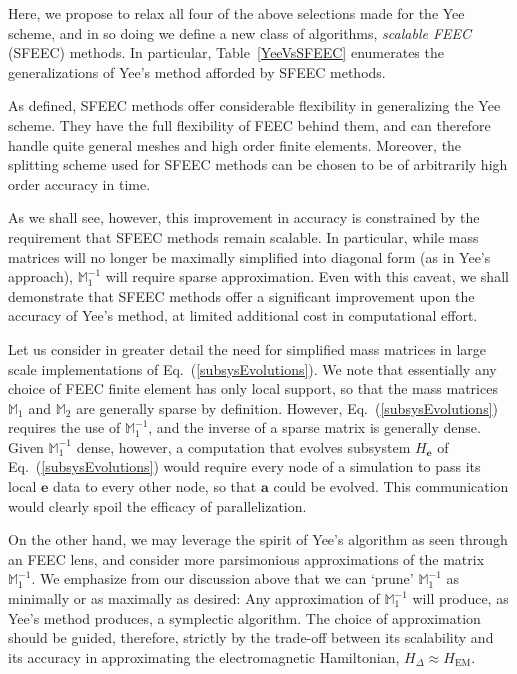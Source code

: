 \documentclass[final,twocolumn]{elsarticle}
\newcommand{\w}[1]{\ensuremath{\mathbf{#1}}} %
\newcommand*\mM{\mathbb{M}}
\begin{document}
Here, we propose to relax all four of the above selections made for the Yee scheme, and in so doing we define a new class of algorithms, \emph{scalable FEEC} (SFEEC) methods. In particular, Table~\ref{YeeVsSFEEC} enumerates the generalizations of Yee's method afforded by SFEEC methods.

As defined, SFEEC methods offer considerable flexibility in generalizing the Yee scheme. They have the full flexibility of FEEC behind them, and can therefore handle quite general meshes and high order finite elements. Moreover, the splitting scheme used for SFEEC methods can be chosen to be of arbitrarily high order accuracy in time.

As we shall see, however, this improvement in accuracy is constrained by the requirement that SFEEC methods remain scalable. In particular, while mass matrices will no longer be maximally simplified into diagonal form (as in Yee's approach), $\mM_1^{-1}$ will require sparse approximation. Even with this caveat, we shall demonstrate that SFEEC methods offer a significant improvement upon the accuracy of Yee's method, at limited additional cost in computational effort.

Let us consider in greater detail the need for simplified mass matrices in large scale implementations of Eq.~(\ref{subsysEvolutions}). We note that essentially any choice of FEEC finite element has only local support, so that the mass matrices $\mM_1$ and $\mM_2$ are generally sparse by definition. However, Eq.~(\ref{subsysEvolutions}) requires the use of $\mM_1^{-1}$, and the inverse of a sparse matrix is generally dense. Given $\mM_1^{-1}$ dense, however, a computation that evolves subsystem ${H_\w{e}}$ of Eq.~(\ref{subsysEvolutions}) would require every node of a simulation to pass its local $\w{e}$ data to every other node, so that $\w{a}$ could be evolved. This communication would clearly spoil the efficacy of parallelization.

On the other hand, we may leverage the spirit of Yee's algorithm as seen through an FEEC lens, and consider more parsimonious approximations of the matrix $\mM_1^{-1}$. We emphasize from our discussion above that we can `prune' $\mM_1^{-1}$ as minimally or as maximally as desired: Any approximation of $\mM_1^{-1}$ will produce, as Yee's method produces, a symplectic algorithm. The choice of approximation should be guided, therefore, strictly by the trade-off between its scalability and its accuracy in approximating the electromagnetic Hamiltonian, $H_\Delta\approx H_{\text{EM}}$.
\end{document}
